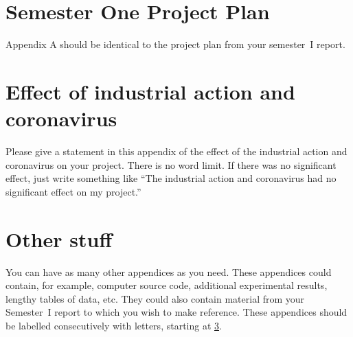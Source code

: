 \documentclass[a4paper,fleqn,usenatbib]{mnras}
\begin{document}
\section{Semester One Project Plan}
\label{App:project plan}
Appendix A  should be identical to the project plan from your semester~I report. 

\section{Effect of industrial action and coronavirus}
\label{2020 special}
Please give a statement in this appendix of the effect of the industrial action and coronavirus on your project. There is no word limit. If there was no significant effect, just write something like ``The industrial action and coronavirus had no significant effect on my project.''


\section{Other stuff}
\label{other appendices}
You can have as many other appendices as you need. These appendices could contain, for example, computer source code, additional experimental results, lengthy tables of data, etc.  They could also contain material from your Semester~I report to which you wish to make reference. These appendices should be labelled consecutively with letters, starting at \ref{other appendices}.




\bsp	%
\label{lastpage}
\end{document}

